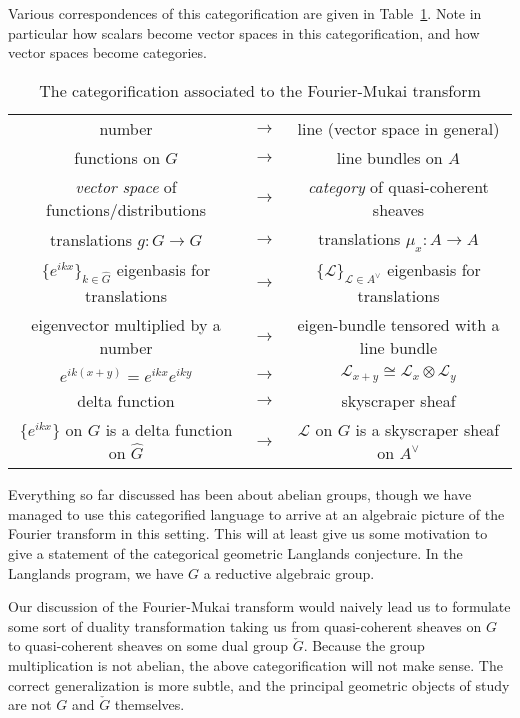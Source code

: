 Various correspondences of this categorification are given in Table~\ref{tab:fourier_mukai}. Note in particular how scalars become vector spaces in this categorification, and how vector spaces become categories. 
\begin{table}
	\centering
	\begin{tabular}{c c  c}
		number & $\to$ & line (vector space in general)\\
		functions on $G$ & $\to$ & line bundles on $A$\\
		\emph{vector space} of functions/distributions & $\to$ & \emph{category} of quasi-coherent sheaves\\
		translations $g: G \to G$ & $\to$ & translations $\mu_x: A \to A$\\
		$\{e^{ikx}\}_{k \in \hat G}$ eigenbasis for translations & $\to$ & $
		\{\mathcal L\}_{\mathcal L \in A^\vee}$ eigenbasis for translations\\
		eigenvector multiplied by a number & $\to$ & eigen-bundle tensored with a line bundle\\
		$e^{ik(x+y)} = e^{ikx} e^{iky}$ & $\to$ & $\mathcal L_{x+y} \cong \mathcal L_x \otimes \mathcal L_y$\\
		delta function & $\to$ & skyscraper sheaf\\
		$\{e^{ikx}\}$ on $G$ is a delta function on $\hat G$ & $\to$ & $\mathcal L$ on $G$ is a skyscraper sheaf on $A^\vee$
	\end{tabular}
	\caption{The categorification associated to the Fourier-Mukai transform}
	\label{tab:fourier_mukai}
\end{table}
 
Everything so far discussed has been about abelian groups, though we have managed to use this categorified language to arrive at an algebraic picture of the Fourier transform in this setting. This will at least give us some motivation to give a statement of the categorical geometric Langlands conjecture. In the Langlands program, we have $G$ a reductive algebraic group. 

Our discussion of the Fourier-Mukai transform would naively lead us to formulate some sort of duality transformation taking us from quasi-coherent sheaves on $G$ to quasi-coherent sheaves on some dual group $\check G$. Because the group multiplication is not abelian, the above categorification will not make sense. The correct generalization is more subtle, and the principal geometric objects of study are not $G$ and $\check G$ themselves.

